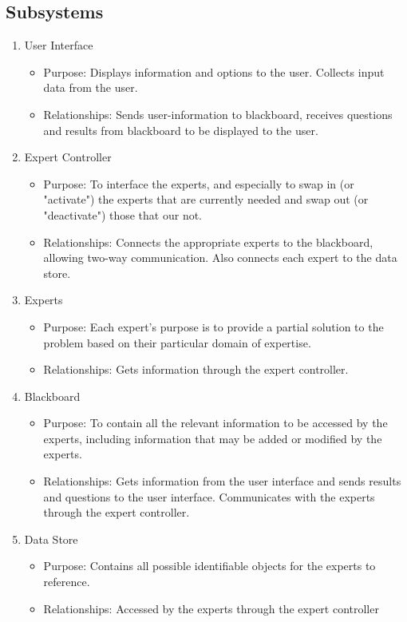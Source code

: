 \documentclass[]{article}
\begin{document}
\subsection{Subsystems}
\label{sub:subsystems}
\begin{enumerate}
	\item User Interface
	\begin{itemize}
	    \item Purpose: 	Displays information and options to the user. Collects input data from the user.
	    \item Relationships: Sends user-information to blackboard, receives questions and results from blackboard to be displayed to the user.
	\end{itemize}
	\item Expert Controller
	\begin{itemize}
	    \item Purpose: To interface the experts, and especially to swap in (or "activate") the experts that are currently needed and swap out (or "deactivate") those that our not.
	    \item Relationships: Connects the appropriate experts to the blackboard, allowing two-way communication. Also connects each expert to the data store.
	\end{itemize}
	\item Experts
	\begin{itemize}
	    \item Purpose: Each expert's purpose is to provide a partial solution to the problem based on their particular domain of expertise.
	    \item Relationships: Gets information through the expert controller.
	\end{itemize}
	\item Blackboard
	\begin{itemize}
	    \item Purpose: To contain all the relevant information to be accessed by the experts, including information that may be added or modified by the experts.
	    \item Relationships: Gets information from the user interface and sends results and questions to the user interface. Communicates with the experts through the expert controller.
	\end{itemize}
	\item Data Store
	\begin{itemize}
	    \item Purpose: Contains all possible identifiable objects for the experts to reference.
	    \item Relationships: Accessed by the experts through the expert controller
	\end{itemize}
\end{enumerate}
\end{document}
